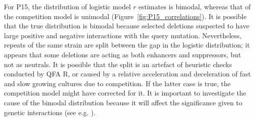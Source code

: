 
For P15, the distribution of logistic model \(r\) estimates is
bimodal, whereas that of the competition model is unimodal
(Figure~\ref{fig:P15_correlations}). It is possible that the true
distribution is bimodal because \citet{Addinall2011} selected
deletions suspected to have large positive and negative interactions
with the query mutation. Nevertheless, repeats of the same strain are
split between the gap in the logistic distribution; it appears that
some deletions are acting as both enhancers and suppressors, but not
as neutrals. It is possible that the split is an artefact of heuristic
checks conducted by QFA R, or caused by a relative acceleration and
deceleration of fast and slow growing cultures due to competition. If
the latter case is true, the competition model might have corrected
for it.
It is important to investigate the cause of the bimodal distribution
because it will affect the significance given to genetic interactions
(see e.g. \citet{Addinall2011}).




